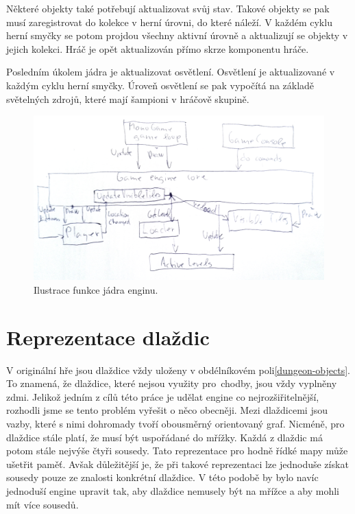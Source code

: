 Některé objekty také potřebují aktualizovat svůj stav. Takové objekty se pak musí zaregistrovat do kolekce v herní úrovni,
do které náleží. V každém cyklu herní smyčky se potom projdou všechny aktivní úrovně a aktualizují se objekty v jejich kolekci.
Hráč je opět aktualizován přímo skrze komponentu hráče.

Posledním úkolem jádra je aktualizovat osvětlení. Osvětlení je aktualizované v každým cyklu herní smyčky. Úroveň osvětlení 
se pak vypočítá na základě světelných zdrojů, které mají šampioni v hráčově skupině.

\begin{figure}[H]\centering
\includegraphics[width=\textwidth]{./img/engine-core.png}
\caption{Ilustrace funkce jádra enginu.}
\label{engine-core}
\end{figure}


\section{Reprezentace dlaždic}\label{tile-representation}

V originální hře jsou dlaždice vždy uloženy v obdélníkovém poli\vref{dungeon-objects}. To znamená, že dlaždice, které nejsou využity pro~chodby,
jsou vždy vyplněny zdmi. Jelikož jedním z cílů této práce je udělat engine co nejrozšiřitelnější, rozhodli jsme se tento problém vyřešit
o něco obecněji. Mezi dlaždicemi jsou vazby, které s nimi dohromady tvoří obousměrný orientovaný graf. Nicméně, pro dlaždice stále platí, že musí být
uspořádané do mřížky. Každá z dlaždic má potom stále nejvýše čtyři sousedy. Tato reprezentace pro hodně řídké mapy může ušetřit paměť.
Avšak důležitější je, že při takové reprezentaci lze jednoduše získat sousedy pouze ze znalosti konkrétní dlaždice. V této 
podobě by bylo navíc jednoduší engine upravit tak, aby dlaždice nemusely být na mřížce a aby mohli mít více sousedů.

